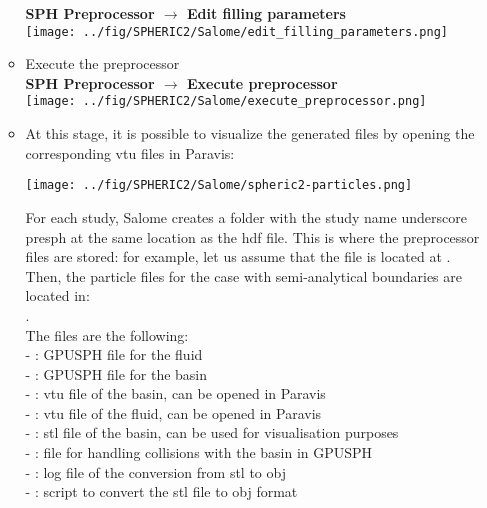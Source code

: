 \documentclass{../GPUSPHtemplate}
\begin{document}
\begin{enumerate}
\begin{itemize}
    \textbf{SPH Preprocessor $\to$ Edit filling parameters}\\
    \texttt{[image: ../fig/SPHERIC2/Salome/edit\_filling\_parameters.png]}
  \item Execute the preprocessor\\
    \textbf{SPH Preprocessor $\to$ Execute preprocessor}\smallskip\\
    \texttt{[image: ../fig/SPHERIC2/Salome/execute\_preprocessor.png]}
  \item At this stage, it is possible to visualize the generated files by opening the corresponding vtu files in Paravis:\\
    \begin{center}\texttt{[image: ../fig/SPHERIC2/Salome/spheric2-particles.png]}\end{center}
    
    For each study, Salome creates a folder with the study name underscore presph at the same location as the hdf file.
    This is where the preprocessor files are stored: for example, let us assume that the  file
    is located at .
    Then, the particle files for the case with semi-analytical boundaries are located in:\\
    . \\
    The files are the following:\\
    - :  GPUSPH file for the fluid\\
    - : GPUSPH file for the basin\\
    - : vtu file of the basin, can be opened in Paravis\\
    - : vtu file of the fluid, can be opened in Paravis\\
    - : stl file of the basin, can be used for visualisation purposes\\
    - : file for handling collisions with the basin in GPUSPH\\
    - : log file of the conversion from stl to obj\\
    - : script to convert the stl file to obj format
  \end{itemize}
  

\end{enumerate}
\end{document}
